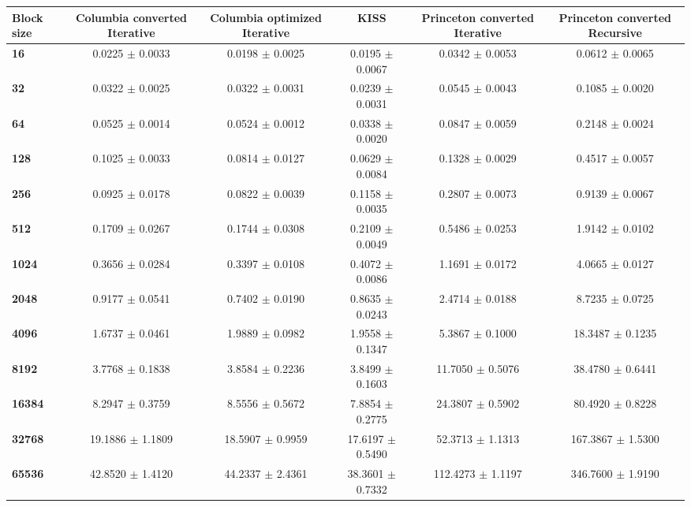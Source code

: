 \begin{tabular}{|l|c|c|c|c|c|}\hline
\textbf{Block size}  & \textbf{Columbia converted Iterative} & \textbf{Columbia optimized Iterative} & \textbf{KISS} & \textbf{Princeton converted Iterative} & \textbf{Princeton converted Recursive}\\\hline
\textbf{16}  & 0.0225 $\pm$ 0.0033 & 0.0198 $\pm$ 0.0025 & 0.0195 $\pm$ 0.0067 & 0.0342 $\pm$ 0.0053 & 0.0612 $\pm$ 0.0065\\\hline
\textbf{32}  & 0.0322 $\pm$ 0.0025 & 0.0322 $\pm$ 0.0031 & 0.0239 $\pm$ 0.0031 & 0.0545 $\pm$ 0.0043 & 0.1085 $\pm$ 0.0020\\\hline
\textbf{64}  & 0.0525 $\pm$ 0.0014 & 0.0524 $\pm$ 0.0012 & 0.0338 $\pm$ 0.0020 & 0.0847 $\pm$ 0.0059 & 0.2148 $\pm$ 0.0024\\\hline
\textbf{128}  & 0.1025 $\pm$ 0.0033 & 0.0814 $\pm$ 0.0127 & 0.0629 $\pm$ 0.0084 & 0.1328 $\pm$ 0.0029 & 0.4517 $\pm$ 0.0057\\\hline
\textbf{256}  & 0.0925 $\pm$ 0.0178 & 0.0822 $\pm$ 0.0039 & 0.1158 $\pm$ 0.0035 & 0.2807 $\pm$ 0.0073 & 0.9139 $\pm$ 0.0067\\\hline
\textbf{512}  & 0.1709 $\pm$ 0.0267 & 0.1744 $\pm$ 0.0308 & 0.2109 $\pm$ 0.0049 & 0.5486 $\pm$ 0.0253 & 1.9142 $\pm$ 0.0102\\\hline
\textbf{1024}  & 0.3656 $\pm$ 0.0284 & 0.3397 $\pm$ 0.0108 & 0.4072 $\pm$ 0.0086 & 1.1691 $\pm$ 0.0172 & 4.0665 $\pm$ 0.0127\\\hline
\textbf{2048}  & 0.9177 $\pm$ 0.0541 & 0.7402 $\pm$ 0.0190 & 0.8635 $\pm$ 0.0243 & 2.4714 $\pm$ 0.0188 & 8.7235 $\pm$ 0.0725\\\hline
\textbf{4096}  & 1.6737 $\pm$ 0.0461 & 1.9889 $\pm$ 0.0982 & 1.9558 $\pm$ 0.1347 & 5.3867 $\pm$ 0.1000 & 18.3487 $\pm$ 0.1235\\\hline
\textbf{8192}  & 3.7768 $\pm$ 0.1838 & 3.8584 $\pm$ 0.2236 & 3.8499 $\pm$ 0.1603 & 11.7050 $\pm$ 0.5076 & 38.4780 $\pm$ 0.6441\\\hline
\textbf{16384}  & 8.2947 $\pm$ 0.3759 & 8.5556 $\pm$ 0.5672 & 7.8854 $\pm$ 0.2775 & 24.3807 $\pm$ 0.5902 & 80.4920 $\pm$ 0.8228\\\hline
\textbf{32768}  & 19.1886 $\pm$ 1.1809 & 18.5907 $\pm$ 0.9959 & 17.6197 $\pm$ 0.5490 & 52.3713 $\pm$ 1.1313 & 167.3867 $\pm$ 1.5300\\\hline
\textbf{65536} & 42.8520 $\pm$ 1.4120 & 44.2337 $\pm$ 2.4361 & 38.3601 $\pm$ 0.7332 & 112.4273 $\pm$ 1.1197 & 346.7600 $\pm$ 1.9190\\\hline
\end{tabular}
